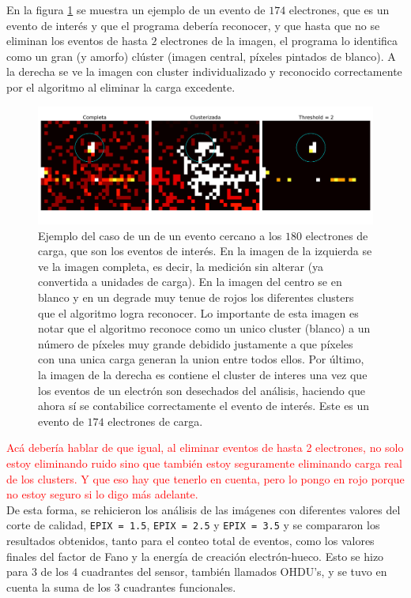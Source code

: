 \indent En la figura \ref{fig:ClusterPegoteado} se muestra un ejemplo de un evento de $174$ electrones, que es un evento de interés y que el programa debería reconocer, y que hasta que no se eliminan los eventos de hasta $2$ electrones de la imagen, el programa lo identifica como un gran (y amorfo) clúster (imagen central, píxeles pintados de blanco). A la derecha se ve la imagen con cluster individualizado y reconocido correctamente por el algoritmo al eliminar la carga excedente.
\begin{figure}[H]
    \centering
    \includegraphics[scale=0.4]{Figs/despegoteo_clusters.pdf}
    \caption{\footnotesize{Ejemplo del caso de un de un evento cercano a los $180$ electrones de carga, que son los eventos de interés. En la imagen de la izquierda se ve la imagen completa, es decir, la medición sin alterar (ya convertida a unidades de carga). En la imagen del centro se en blanco y en un degrade muy tenue de rojos los diferentes clusters que el algoritmo logra reconocer. Lo importante de esta imagen es notar que el algoritmo reconoce como un unico cluster (blanco) a un número de píxeles muy grande debidido justamente a que píxeles con una unica carga generan la union entre todos ellos. Por último, la imagen de la derecha es contiene el cluster de interes una vez que los eventos de un electrón son desechados del análisis, haciendo que ahora sí se contabilice correctamente el evento de interés. Este es un evento de $174$ electrones de carga.}}
    \label{fig:ClusterPegoteado}
\end{figure}
\textcolor{red}{Acá debería hablar de que igual, al eliminar eventos de hasta 2 electrones, no solo estoy eliminando ruido sino que también estoy seguramente eliminando carga real de los clusters. Y que eso hay que tenerlo en cuenta, pero lo pongo en rojo porque no estoy seguro si lo digo más adelante.}\\
\indent De esta forma, se rehicieron los análisis de las imágenes con diferentes valores del corte de calidad, \verb|EPIX = 1.5|, \verb|EPIX = 2.5| y \verb|EPIX = 3.5| y se compararon los resultados obtenidos, tanto para el conteo total de eventos, como los valores finales del factor de Fano y la energía de creación electrón-hueco. Esto se hizo para $3$ de los $4$ cuadrantes del sensor, también llamados OHDU's, y se tuvo en cuenta la suma de los 3 cuadrantes funcionales.

